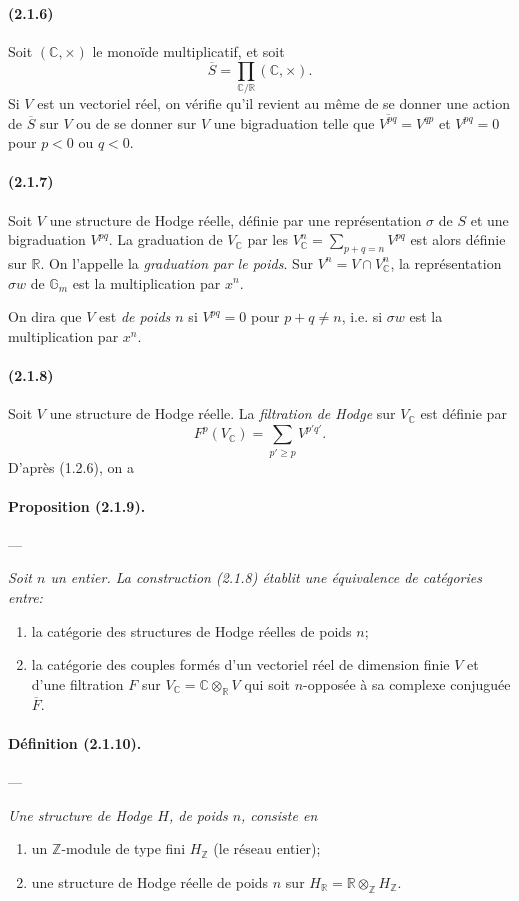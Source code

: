\documentclass[10pt]{article}
\newcommand{\C}{\mathbb C}
\newcommand{\Z}{\mathbb Z}
\newcommand{\fg}{\guillemotright}
\newcommand{\og}{\guillemotleft}
\newcommand{\R}{\mathbb R}
\newcommand{\Gm}{\mathbb G_m}
\begin{document}
\paragraph{(2.1.6)} Soit $(\C,\times)$ le monoïde multiplicatif, et soit
\[
\overline S=\prod_{\C/\R}(\C,\times).
\]
Si $V$ est un vectoriel réel, on vérifie qu'il revient au même de se donner une action de $\overline S$ sur $V$ ou de se donner sur $V$ une bigraduation telle que $\overline{V^{pq}}=V^{qp}$ et $V^{pq}=0$ pour $p<0$ ou $q<0$.

\paragraph{(2.1.7)} Soit $V$ une structure de Hodge réelle, définie par une représentation $\sigma$ de $S$ et une bigraduation $V^{pq}$. La graduation de $V_\C$ par les $V_\C^n=\sum_{p+q=n}V^{pq}$ est alors définie sur $\R$. On l'appelle la \emph{graduation par le poids}. Sur $V^n=V\cap V_\C^n$, la représentation $\sigma w$ de $\Gm$ est la multiplication par $x^n$.

On dira que $V$ est \emph{de poids $n$} si $V^{pq}=0$ pour $p+q\ne n$, i.e. si $\sigma w$ est la multiplication par $x^n$.

\paragraph{(2.1.8)} Soit $V$ une structure de Hodge réelle. La \emph{filtration de Hodge} sur $V_\C$ est définie par
\[
F^p(V_\C)=\sum_{p'\ge p}V^{p'q'}.
\]
D'après (1.2.6), on a

\paragraph{Proposition (2.1.9).} --- {\itshape Soit $n$ un entier. La construction (2.1.8) établit une équivalence de catégories entre:
\begin{enumerate}[label=\alph*)]
\item la catégorie des structures de Hodge réelles de poids $n$;
\item la catégorie des couples formés d'un vectoriel réel de dimension finie $V$ et d'une filtration $F$ sur $V_\C=\C\otimes_\R V$ qui soit $n$-opposée à sa complexe conjuguée $\overline F$.
\end{enumerate}}

\paragraph{Définition (2.1.10).} --- {\itshape Une structure de Hodge $H$, de poids $n$, consiste en
\begin{enumerate}[label=\alph*)]
\item un $\Z$-module de type fini $H_\Z$ (le \og réseau entier\fg{});
\item une structure de Hodge réelle de poids $n$ sur $H_\R=\R\otimes_\Z H_\Z$.
\end{enumerate}}
\end{document}
